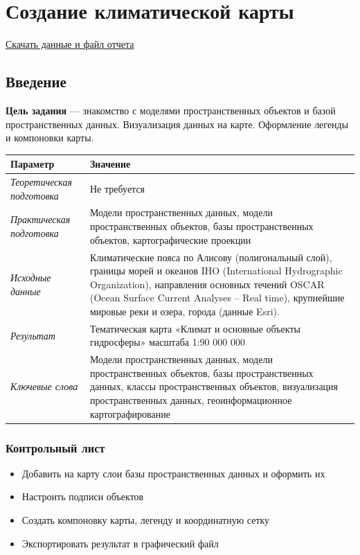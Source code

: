 \documentclass[12pt,]{book}
\providecommand{\tightlist}{%
  \setlength{\itemsep}{0pt}\setlength{\parskip}{0pt}}
\begin{document}
\hypertarget{map-design-climates}{%
\chapter{Создание климатической карты}\label{map-design-climates}}

\href{http://autolab.geogr.msu.ru/gis/data/Ex03.zip}{Скачать данные и файл отчета}

\hypertarget{map-design-climates-intro}{%
\section{Введение}\label{map-design-climates-intro}}

\textbf{Цель задания} --- знакомство с моделями пространственных объектов и базой пространственных данных. Визуализация данных на карте. Оформление легенды и компоновки карты.

\begin{longtable}[]{@{}ll@{}}
\toprule
Параметр & Значение\tabularnewline
\midrule
\endhead
\emph{Теоретическая подготовка} & Не требуется\tabularnewline
\emph{Практическая подготовка} & Модели пространственных данных, модели пространственных объектов, базы пространственных объектов, картографические проекции\tabularnewline
\emph{Исходные данные} & Климатические пояса по Алисову (полигональный слой), границы морей и океанов IHO (International Hydrographic Organization), направления основных течений OSCAR (Ocean Surface Current Analyses -- Real time), крупнейшие мировые реки и озера, города (данные Esri).\tabularnewline
\emph{Результат} & Тематическая карта «Климат и основные объекты гидросферы» масштаба 1:90 000 000\tabularnewline
\emph{Ключевые слова} & Модели пространственных данных, модели пространственных объектов, базы пространственных данных, классы пространственных объектов, визуализация пространственных данных, геоинформационное картографирование\tabularnewline
\bottomrule
\end{longtable}

\hypertarget{map-design-climates-control}{%
\subsection{Контрольный лист}\label{map-design-climates-control}}

\begin{itemize}
\tightlist
\item
  Добавить на карту слои базы пространственных данных и оформить их
\item
  Настроить подписи объектов
\item
  Создать компоновку карты, легенду и координатную сетку
\item
  Экспортировать результат в графический файл
\end{itemize}
\end{document}
